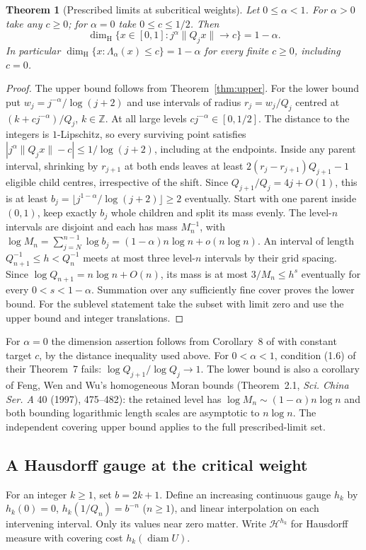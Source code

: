 \documentclass[11pt]{article}
\newtheorem{theorem}{Theorem}
\theoremstyle{definition}
\theoremstyle{remark}
\newcommand{\Z}{\mathbb{Z}}
\newcommand{\dimH}{\dim_{\mathrm{H}}}
\newcommand{\Lam}{\Lambda}
\begin{document}
\begin{theorem}[Prescribed limits at subcritical weights]\label{conj:weight}
Let $0\le\alpha<1$. For $\alpha>0$ take any $c\ge0$; for $\alpha=0$
take $0\le c\le1/2$. Then
\[
 \dimH\{x\in[0,1]: j^\alpha\|Q_jx\|\longrightarrow c\}=1-\alpha .
\]
In particular $\dimH\{x:\Lam_\alpha(x)\le c\}=1-\alpha$ for every
finite $c\ge0$, including $c=0$.
\end{theorem}
\begin{proof}
The upper bound follows from Theorem~\ref{thm:upper}. For the lower
bound put $w_j=j^{-\alpha}/\log(j+2)$ and use intervals
of radius $r_j=w_j/Q_j$ centred at $(k+cj^{-\alpha})/Q_j$, $k\in\Z$.
At all large levels $cj^{-\alpha}\in[0,1/2]$. The distance to the
integers is $1$-Lipschitz, so every surviving point satisfies
$|j^\alpha\|Q_jx\|-c|\le 1/\log(j+2)$, including at the endpoints.
Inside any parent interval, shrinking by $r_{j+1}$ at both ends leaves
at least $2(r_j-r_{j+1})Q_{j+1}-1$ eligible child centres, irrespective
of the shift. Since $Q_{j+1}/Q_j=4j+O(1)$, this is at least
$b_j=\lfloor j^{1-\alpha}/\log(j+2)\rfloor\ge2$ eventually.
Start with one parent inside $(0,1)$, keep exactly $b_j$ whole children
and split its mass evenly. The level-$n$ intervals are disjoint and
each has mass $M_n^{-1}$, with
$\log M_n=\sum_{j=N}^{n-1}\log b_j=(1-\alpha)n\log n+o(n\log n)$.
An interval of length $Q_{n+1}^{-1}\le h<Q_n^{-1}$ meets at most three
level-$n$ intervals by their grid spacing. Since
$\log Q_{n+1}=n\log n+O(n)$, its mass is at most $3/M_n\le h^s$
eventually for every $0<s<1-\alpha$. Summation over any sufficiently
fine cover proves the lower bound. For the sublevel statement take
the subset with limit zero and use the upper bound and integer translations.
\end{proof}

For $\alpha=0$ the dimension assertion follows from Corollary~8 of
\cite{BLR} with constant target $c$, by the distance inequality used
above. For $0<\alpha<1$, condition (1.6) of their Theorem~7 fails:
$\log Q_{j+1}/\log Q_j\to1$. The lower bound is also a corollary of
Feng, Wen and Wu's homogeneous Moran bounds (Theorem~2.1,
\emph{Sci. China Ser. A} 40 (1997), 475--482): the retained level
has $\log M_n\sim(1-\alpha)n\log n$ and both bounding logarithmic
length scales are asymptotic to $n\log n$. The independent covering
upper bound applies to the full prescribed-limit set.
\subsection{A Hausdorff gauge at the critical weight}
For an integer $k\ge1$, set $b=2k+1$. Define an increasing continuous
gauge $h_k$ by $h_k(0)=0$, $h_k(1/Q_n)=b^{-n}$ ($n\ge1$), and
linear interpolation on each intervening interval. Only its values
near zero matter. Write $\mathcal H^{h_k}$ for Hausdorff measure with
covering cost $h_k(\operatorname{diam} U)$.
\end{document}
